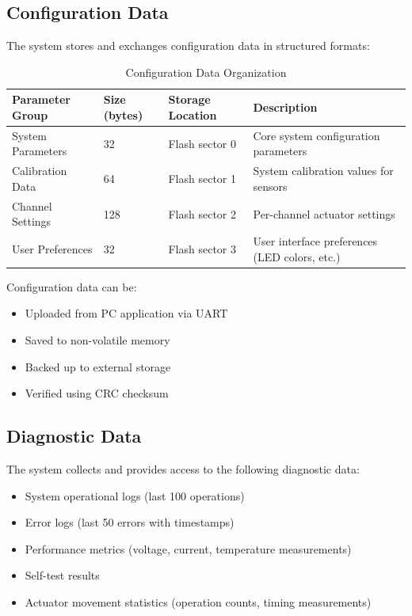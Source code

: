 \documentclass[12pt,a4paper,twoside,openright]{book}
\newcommand{\tabletextfont}{\normalfont\rmfamily}
\newcommand{\tableheadfont}{\normalfont\bfseries}
\begin{document}
\subsection{Configuration Data}

The system stores and exchanges configuration data in structured formats:

\begin{table}[h]
\centering
\setlength{\tabcolsep}{4pt} %
\begin{tabular}{|p{}|p{}|p{}|p{}|}
\hline
\tableheadfont\textbf{Parameter Group} & \tableheadfont\textbf{Size (bytes)} & \tableheadfont\textbf{Storage Location} & \tableheadfont\textbf{Description} \\
\hline
\tabletextfont System Parameters & 32 & Flash sector 0 & Core system configuration parameters \\
\hline
\tabletextfont Calibration Data & 64 & Flash sector 1 & System calibration values for sensors \\
\hline
\tabletextfont Channel Settings & 128 & Flash sector 2 & Per-channel actuator settings \\
\hline
\tabletextfont User Preferences & 32 & Flash sector 3 & User interface preferences (LED colors, etc.) \\
\hline
\end{tabular}
\caption{Configuration Data Organization}
\end{table}

Configuration data can be:
\begin{itemize}
    \item Uploaded from PC application via UART
    \item Saved to non-volatile memory
    \item Backed up to external storage
    \item Verified using CRC checksum
\end{itemize}

\subsection{Diagnostic Data}

The system collects and provides access to the following diagnostic data:

\begin{itemize}
    \item System operational logs (last 100 operations)
    \item Error logs (last 50 errors with timestamps)
    \item Performance metrics (voltage, current, temperature measurements)
    \item Self-test results
    \item Actuator movement statistics (operation counts, timing measurements)
\end{itemize}
\end{document}
